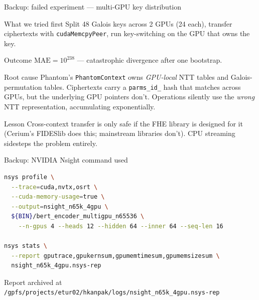 \documentclass[aspectratio=169]{beamer}
\begin{document}
\begin{frame}{Backup: failed experiment — multi-GPU key distribution}
  \begin{block}{What we tried first}
    Split 48 Galois keys across 2 GPUs (24 each), transfer ciphertexts with
    \texttt{cudaMemcpyPeer}, run key-switching on the GPU that owns the key.
  \end{block}
  \pause
  \begin{alertblock}{Outcome}
    $\textrm{MAE} = 10^{238}$ — catastrophic divergence after one bootstrap.
  \end{alertblock}
  \pause
  \begin{block}{Root cause}
    \footnotesize
    Phantom's \texttt{PhantomContext} owns \emph{GPU-local} NTT tables and
    Galois-permutation tables. Ciphertexts carry a \texttt{parms\_id\_} hash
    that matches across GPUs, but the underlying GPU pointers don't. Operations
    silently use the \emph{wrong} NTT representation, accumulating exponentially.
  \end{block}
  \pause
  \begin{block}{Lesson}
    \small
    Cross-context transfer is only safe if the FHE library is designed for it
    (Cerium's FIDESlib does this; mainstream libraries don't).
    CPU streaming sidesteps the problem entirely.
  \end{block}
\end{frame}

\begin{frame}{Backup: NVIDIA Nsight command used}
  \begin{lstlisting}[language=bash]
nsys profile \
  --trace=cuda,nvtx,osrt \
  --cuda-memory-usage=true \
  --output=nsight_n65k_4gpu \
  ${BIN}/bert_encoder_multigpu_n65536 \
    --n-gpus 4 --heads 12 --hidden 64 --inner 64 --seq-len 16

nsys stats \
  --report gputrace,gpukernsum,gpumemtimesum,gpumemsizesum \
  nsight_n65k_4gpu.nsys-rep
  \end{lstlisting}
  \small
  Report archived at\\
  \texttt{/gpfs/projects/etur02/hkanpak/logs/nsight\_n65k\_4gpu.nsys-rep}
\end{frame}
\end{document}
